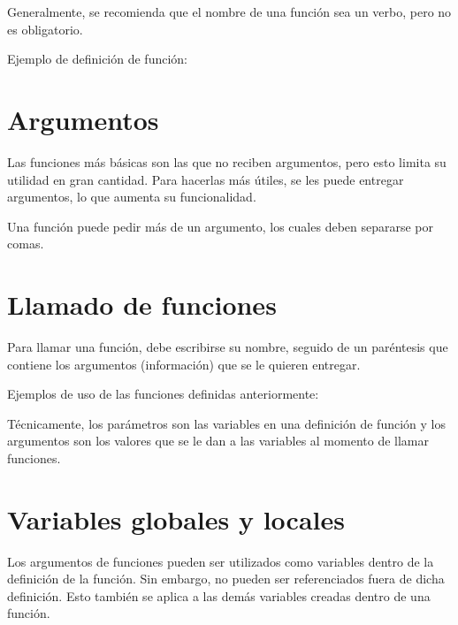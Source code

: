 Generalmente, se recomienda que el nombre de una función sea un verbo, pero no es obligatorio.

Ejemplo de definición de función:


\section{Argumentos}

Las funciones más básicas son las que no reciben argumentos, pero esto limita su utilidad en gran cantidad.
Para hacerlas más útiles, se les puede entregar argumentos, lo que aumenta su funcionalidad.


Una función puede pedir más de un argumento, los cuales deben separarse por comas.


\section{Llamado de funciones}

Para llamar una función, debe escribirse su nombre, seguido de un paréntesis que contiene los argumentos (información) que se le quieren entregar.

Ejemplos de uso de las funciones definidas anteriormente:


Técnicamente, los parámetros son las variables en una definición de función y los argumentos son los valores que se le dan a las variables al momento de llamar funciones.

\section{Variables globales y locales}

Los argumentos de funciones pueden ser utilizados como variables dentro de la definición de la función.
Sin embargo, no pueden ser referenciados fuera de dicha definición.
Esto también se aplica a las demás variables creadas dentro de una función.

